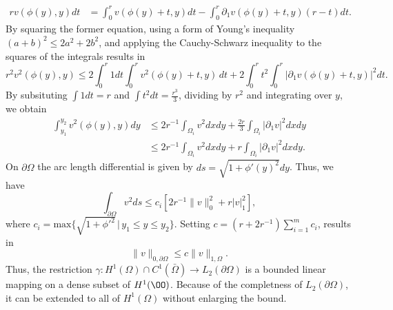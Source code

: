 \begin{bev}
\begin{align*}
        r v(\phi(y), y) dt &= \int_0^r v(\phi(y) + t, y) dt - \int_0^r \partial_1 v(\phi(y) + t, y)(r-t) dt.
    \end{align*}
    By squaring the former equation, using a form of Young's inequality ${(a+b)}^2 \leq 2a^2 + 2b^2$, and applying the Cauchy-Schwarz inequality to the squares of the integrals results in
    \begin{equation}
        r^2 v^2(\phi(y), y) \leq 2 \int_0^r 1 dt \int_0^r v^2(\phi(y) + t, y) \, dt +  2\int_0^r t^2 \int_0^r | \partial_1  v(\phi(y) + t, y) |^2 dt.
    \end{equation}
    By subsituting $\int 1 dt = r$ and $\int t^2 dt = \frac{r^3}{3}$, dividing by $r^2$ and integrating over $y$, we obtain
    \begin{align*}
        \int_{y_1}^{y_2} v^2(\phi(y), y) dy &\leq  2r^{-1} \int_{\Omega_i} v^2 dx dy + \frac{2r}{3} \int_{\Omega_i} | \partial_1 v |^2 dx dy \\
        &\leq  2r^{-1} \int_{\Omega_i} v^2 dx dy + r \int_{\Omega_i} | \partial_1 v |^2 dx dy.
    \end{align*}
    On $\partial\Omega$ the arc length differential is given by $ds = \sqrt{1 + \phi'{(y)}^2} dy$. Thus, we have
    \begin{equation}
        \int_{\partial\Omega} v^2 ds \leq c_i \left[ 2r^{-1} \| v \|_0^2 + r | v |^2_1 \right],
    \end{equation}
    where $c_i = \text{max}\{\sqrt{1+{\phi'}^2} \,|\, y_1 \leq y \leq y_2 \}$. Setting $c=(r+2r^{-1})\sum_{i=1}^m c_i$, results in
    \begin{equation}
        \| v \|_{0,\partial\Omega} \leq c \| v \|_{1,\Omega}.
    \end{equation}
    Thus, the restriction $\gamma : H^1(\Omega) \cap C^1(\bar{\Omega}) \to L_2(\partial \Omega)$ is a bounded linear mapping on a dense subset of $H^1(\OO)$. Because of the completness of $L_2(\partial \Omega)$, it can be extended to all of $H^1(\Omega)$ without enlarging the bound.
\end{bev}